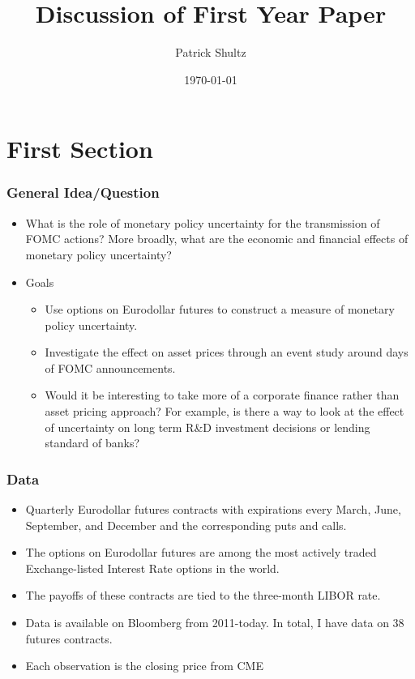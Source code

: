 \documentclass{beamer}
\title[]{Discussion of First Year Paper} %
\author{Patrick Shultz} %
\date{\today} %
\begin{document}


\section{First Section} %

\begin{frame}
\frametitle{General Idea/Question}
\begin{itemize}
\item What is the role of monetary policy uncertainty for the transmission of FOMC actions?  More broadly, what are the economic and financial effects of monetary policy uncertainty?
\item Goals
\begin{itemize}
	\item Use options on Eurodollar futures to construct a measure of monetary policy uncertainty. 
	\item Investigate the effect on asset prices through an event study around days of FOMC announcements. 
	\item Would it be interesting to take more of a corporate finance rather than asset pricing approach? For example, is there a way to look at the effect of uncertainty on long term R\&D investment decisions or lending standard of banks? 
\end{itemize}
\end{itemize}
\end{frame}


\begin{frame}
\frametitle{Data}
\begin{itemize}
	\item Quarterly Eurodollar futures contracts with expirations every March, June, September, and December and the corresponding puts and calls.
	\item The options on Eurodollar futures are among the most actively traded Exchange-listed Interest Rate options in the world. 
	\item The payoffs of these contracts are tied to the three-month LIBOR rate. 
	\item Data is available on Bloomberg from 2011-today. In total, I have data on 38 futures contracts. 
	\item Each observation is the closing price from CME
\end{itemize}

\end{frame}
\end{document}
